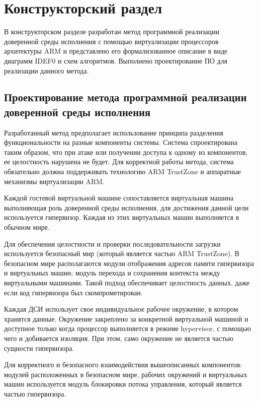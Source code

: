 \section{Конструкторский раздел}

В конструкторском разделе разработан метод программной реализации доверенной среды исполнения с помощью виртуализации процессоров архитектуры ARM и представлено его формализованное описание в виде диаграмм IDEF0 и схем алгоритмов. Выполнено проектирование ПО для реализации данного метода.

\subsection{Проектирование метода программной реализации доверенной среды исполнения}

Разработанный метод предполагает использование принципа разделения функциональности на разные компоненты системы. Система спроектирована таким образом, что при атаке или получении доступа к одному из компонентов, ее целостность нарушена не будет. Для корректной работы метода, система обязательно должна поддерживать технологию ARM TrustZone и аппаратные механизмы виртуализации ARM.

Каждой гостевой виртуальной машине сопоставляется виртуальная машина выполняющая роль доверенной среды исполнения, для достижения данной цели используется гипервизор. Каждая из этих виртуальных машин выполняется в обычном мире.

Для обеспечения целостности и проверки последовательности загрузки используется безопасный мир (который является частью ARM TrustZone). В безопасном мире располагаются модули отображения адресов памяти гипервизора и виртуальных машин; модуль перехода и сохранения контекста между виртуальными машинами. Такой подход обеспечивает целостность данных, даже если код гипервизора был скомпрометирован.

Каждая ДСИ использует свое индивидуальное рабочее окружение, в котором хранятся данные. Окружение закреплено за конкретной виртуальной машиной и доступное только когда процессор выполняется в режиме hypervisor, с помощью чего и добивается изоляция. При этом, само окружение не является частью сущности гипервизора.

Для корректного и безопасного взаимодействия вышеописанных компонентов: модулей расположенных в безопасном мире, рабочих окружений и виртуальных машин используется модуль блокировки потока управления, который является частью гипервизора.

